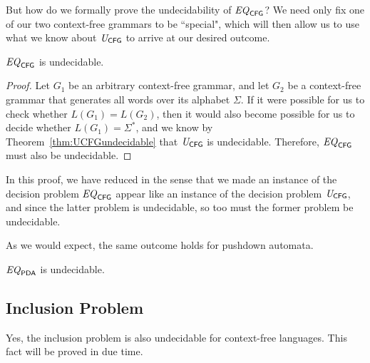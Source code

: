 But how do we formally prove the undecidability of $\mathit{EQ}_{\textsf{CFG}}$? We need only fix one of our two context-free grammars to be ``special", which will then allow us to use what we know about $\mathit{U}_{\textsf{CFG}}$ to arrive at our desired outcome.

\begin{theorem}\label{thm:EQCFGundecidable}
$\mathit{EQ}_{\textsf{CFG}}$ is undecidable.

\begin{proof}
Let $G_{1}$ be an arbitrary context-free grammar, and let $G_{2}$ be a context-free grammar that generates all words over its alphabet $\Sigma$. If it were possible for us to check whether $L(G_{1}) = L(G_{2})$, then it would also become possible for us to decide whether $L(G_{1}) = \Sigma^{*}$, and we know by Theorem~\ref{thm:UCFGundecidable} that $\mathit{U}_{\textsf{CFG}}$ is undecidable. Therefore, $\mathit{EQ}_{\textsf{CFG}}$ must also be undecidable.
\end{proof}
\end{theorem}

In this proof, we have reduced in the sense that we made an instance of the decision problem $\mathit{EQ}_{\textsf{CFG}}$ appear like an instance of the decision problem $\mathit{U}_{\textsf{CFG}}$, and since the latter problem is undecidable, so too must the former problem be undecidable.

As we would expect, the same outcome holds for pushdown automata.

\begin{corollary}\label{cor:EQPDAundecidable}
$\mathit{EQ}_{\textsf{PDA}}$ is undecidable.
\end{corollary}

\subsection*{Inclusion Problem}

\begin{construction}
Yes, the inclusion problem is also undecidable for context-free languages. This fact will be proved in due time.
\end{construction}